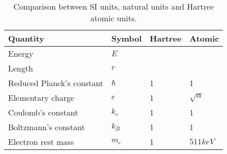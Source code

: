 \begin{table} [H]
	\caption{Comparison between SI units, natural units and Hartree atomic units.  \vspace{2mm}}
	\begin{tabularx}{\textwidth}{X|XXX} \hline\hline
		\label{tab:energies2P2D}
		Quantity & Symbol & Hartree & Atomic \\ \hline
		Energy & $E$ & \\ 
		Length & $r$ & \\
		Reduced Planck's constant & $\hbar$ & 1 & 1 \\
		Elementary charge & $e$ & 1 & $\sqrt{\alpha}$ \\
		Coulomb's constant & $k_e$ & 1 & 1 \\
		Boltzmann's constant & $k_B$ & 1 & 1 \\
		Electron rest mass & $m_e$ & 1 & $511 keV$ \\ \hline\hline
	\end{tabularx}
\end{table}
